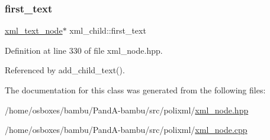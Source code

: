 \subsubsection{\texorpdfstring{first\+\_\+text}{first\_text}}
{\footnotesize\ttfamily \hyperlink{classxml__text__node}{xml\+\_\+text\+\_\+node}$\ast$ xml\+\_\+child\+::first\+\_\+text\hspace{0.3cm}{\ttfamily [private]}}



Definition at line 330 of file xml\+\_\+node.\+hpp.



Referenced by add\+\_\+child\+\_\+text().



The documentation for this class was generated from the following files\+:\begin{DoxyCompactItemize}
\item 
/home/osboxes/bambu/\+Pand\+A-\/bambu/src/polixml/\hyperlink{xml__node_8hpp}{xml\+\_\+node.\+hpp}\item 
/home/osboxes/bambu/\+Pand\+A-\/bambu/src/polixml/\hyperlink{xml__node_8cpp}{xml\+\_\+node.\+cpp}\end{DoxyCompactItemize}
